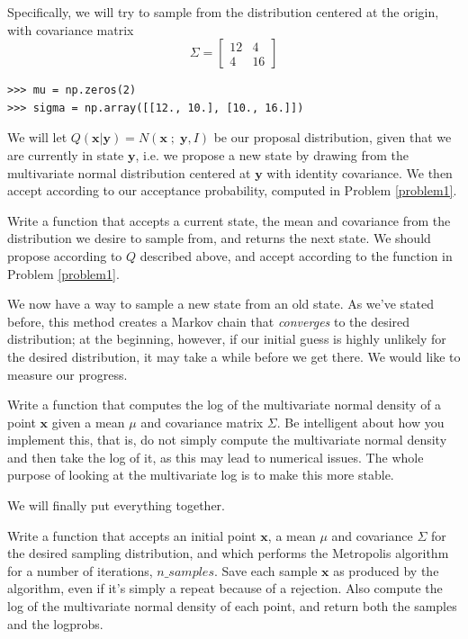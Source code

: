Specifically, we will try to sample from the distribution centered at the origin, with covariance matrix
\begin{equation*}
\Sigma = \left[ \begin{array}{cc} 12 & 4 \\ 4 & 16 \end{array} \right]
\end{equation*}

\begin{lstlisting}
>>> mu = np.zeros(2)
>>> sigma = np.array([[12., 10.], [10., 16.]])
\end{lstlisting}

We will let $Q(\mathbf{x} | \mathbf{y}) = N(\mathbf{x} \; ; \; \mathbf{y}, I)$ be our proposal distribution, given that we are currently in state $\mathbf{y}$, i.e. we propose a new state by drawing from the multivariate normal distribution centered at $\mathbf{y}$ with identity covariance. We then accept according to our acceptance probability, computed in Problem \ref{problem1}.

\begin{problem}
Write a function that accepts a current state, the mean and covariance from the distribution we desire to sample from, and returns the next state. We should propose according to $Q$ described above, and accept according to the function in Problem \ref{problem1}.
\end{problem}

We now have a way to sample a new state from an old state. As we've stated before, this method creates a Markov chain that \emph{converges} to the desired distribution; at the beginning, however, if our initial guess is highly unlikely for the desired distribution, it may take a while before we get there. We would like to measure our progress.

\begin{problem}
Write a function that computes the log of the multivariate normal density of a point $\mathbf{x}$ given a mean $\mu$ and covariance matrix $\Sigma$. Be intelligent about how you implement this, that is, do not simply compute the multivariate normal density and then take the log of it, as this may lead to numerical issues. The whole purpose of looking at the multivariate log is to make this more stable.
\end{problem}

We will finally put everything together.

\begin{problem}
Write a function that accepts an initial point $\mathbf{x}$, a mean $\mu$ and covariance $\Sigma$ for the desired sampling distribution, and which performs the Metropolis algorithm for a number of iterations, $n\_samples$. Save each sample $\mathbf{x}$ as produced by the algorithm, even if it's simply a repeat because of a rejection. Also compute the log of the multivariate normal density of each point, and return both the samples and the logprobs.
\end{problem}

